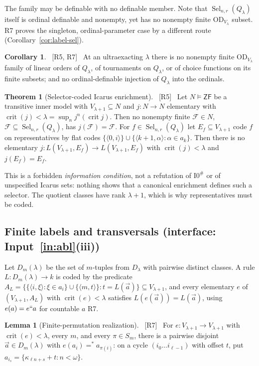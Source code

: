 \documentclass[11pt,letterpaper]{article}
\theoremstyle{definition}
\newtheorem{theorem}[definition]{Theorem}
\newtheorem{lemma}[definition]{Lemma}
\newtheorem{corollary}[definition]{Corollary}
\numberwithin{equation}{section}
\newcommand{\ZF}{\mathsf{ZF}}
\newcommand{\OD}{\mathrm{OD}}
\newcommand{\crit}{\operatorname{crit}}
\newcommand{\Izero}{\mathrm{I0}}
\newcommand{\Sel}{\operatorname{Sel}}
\newcommand{\FF}{\mathcal F}
\newcommand{\src}[1]{\unskip\ {\normalfont\small\sffamily\color{Olive}[#1]}\ }
\newcommand{\R}[1]{\textsf{R#1}}
\begin{document}
The family may be definable with no definable member. Note that $\Sel_{n,r}(Q_\lambda)$ itself is ordinal definable and nonempty, yet has no nonempty finite $\OD_{V_\lambda}$ subset. \R7 proves the singleton, ordinal-parameter case by a different route (Corollary~\ref{cor:label-sel}).

\begin{corollary}\label{cor:orders}\src{R5, R7}
At an ultraexacting $\lambda$ there is no nonempty finite $\OD_{V_\lambda}$ family of linear orders of $Q_\lambda$, of tournaments on $Q_\lambda$, or of choice functions on its finite subsets; and no ordinal-definable injection of $Q_\lambda$ into the ordinals.
\end{corollary}

\begin{theorem}[Selector-coded Icarus enrichment]\label{thm:icarus}\src{R5}
Let $N\models\ZF$ be a transitive inner model with $V_{\lambda+1}\subseteq N$ and $j:N\to N$ elementary with $\crit(j)<\lambda=\sup_nj^n(\crit j)$. Then no nonempty finite $\FF\in N$, $\FF\subseteq\Sel_{n,r}(Q_\lambda)$, has $j(\FF)=\FF$. For $f\in\Sel_{n,r}(Q_\lambda)$ let $E_f\subseteq V_{\lambda+1}$ code $f$ on representatives by flat codes $\{\langle0,i\rangle\}\cup\{\langle k+1,\alpha\rangle:\alpha\in a_k\}$. Then there is no elementary $j:L(V_{\lambda+1},E_f)\to L(V_{\lambda+1},E_f)$ with $\crit(j)<\lambda$ and $j(E_f)=E_f$.
\end{theorem}

This is a forbidden \emph{information condition}, not a refutation of $\Izero^\#$ or of unspecified Icarus sets: nothing shows that a canonical enrichment defines such a selector. The quotient classes have rank $\lambda+1$, which is why representatives must be coded.

\subsection{Finite labels and transversals (interface: Input~\ref{in:abl}(iii))}

Let $D_m(\lambda)$ be the set of $m$-tuples from $D_\lambda$ with pairwise distinct classes. A rule $L:D_m(\lambda)\to k$ is coded by the predicate $A_L=\{\{\langle i,\xi\rangle:\xi\in a_i\}\cup\{\langle m,t\rangle\}:t=L(\vec a)\}\subseteq V_{\lambda+1}$, and every elementary $e$ of $(V_{\lambda+1},A_L)$ with $\crit(e)<\lambda$ satisfies $L(e(\vec a))=L(\vec a)$, using $e(a)=e``a$ for countable $a$ \R7.

\begin{lemma}[Finite-permutation realization]\label{lem:perm}\src{R7}
For $e:V_{\lambda+1}\to V_{\lambda+1}$ with $\crit(e)<\lambda$, every $m$, and every $\pi\in S_m$, there is a pairwise disjoint $\vec a\in D_m(\lambda)$ with $e(a_i)=^*a_{\pi(i)}$: on a cycle $(i_0\dots i_{\ell-1})$ with offset $t$, put $a_{i_s}=\{\kappa_{\ell n+s}+t:n<\omega\}$.
\end{lemma}
\end{document}
